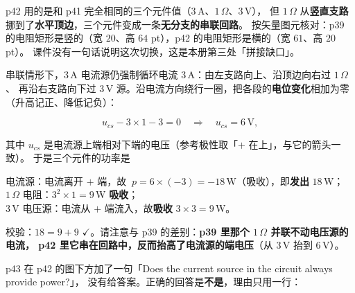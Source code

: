 \documentclass[11pt]{ctexart}
\begin{document}

p42 用的是和 p41 完全相同的三个元件值（$3\,\mathrm{A}$、$1\,\Omega$、$3\,\mathrm{V}$），
但 $1\,\Omega$ 从\textbf{竖直支路}挪到了\textbf{水平顶边}，三个元件变成一条\textbf{无分支的串联回路}。
按矢量图元核对：p39 的电阻矩形是竖的（宽 $20$、高 $64$ pt），p42 的电阻矩形是横的（宽 $61$、高 $20$ pt）。
课件没有一句话说明这次切换，这是本册第三处「拼接缺口」。

串联情形下，$3\,\mathrm{A}$ 电流源仍强制循环电流 $3\,\mathrm{A}$：由左支路向上、沿顶边向右过 $1\,\Omega$、
再沿右支路向下过 $3\,\mathrm{V}$ 源。沿电流方向绕行一圈，把各段的\textbf{电位变化}相加为零
（升高记正、降低记负）：

\[ u_{cs} - 3\times1 - 3 = 0 \quad\Longrightarrow\quad u_{cs} = 6\,\mathrm{V}, \]

其中 $u_{cs}$ 是电流源上端相对下端的电压（参考极性取「$+$ 在上」，与它的箭头一致）。
于是三个元件的功率是

\par\vspace{1pt}
\noindent
电流源：电流离开 $+$ 端，故 $\ p = 6\times(-3) = -18\,\mathrm{W}$（吸收），即\textbf{发出} $18\,\mathrm{W}$；\\
$1\,\Omega$ 电阻：$3^2\times1 = 9\,\mathrm{W}$ \textbf{吸收}；\\
$3\,\mathrm{V}$ 电压源：电流从 $+$ 端流入，故\textbf{吸收} $3\times3 = 9\,\mathrm{W}$。
\par\vspace{1pt}

校验：$18 = 9+9$ $\checkmark$。请注意与 p39 的差别：\textbf{p39 里那个 $1\,\Omega$ 并联不动电压源的电流，
p42 里它串在回路中，反而抬高了电流源的端电压}（从 $3\,\mathrm{V}$ 抬到 $6\,\mathrm{V}$）。


p43 在 p42 的图下方加了一句「Does the current source in the circuit always provide power?」，
没有给答案。正确的回答是\textbf{不是}，理由只用一行：

\end{document}

